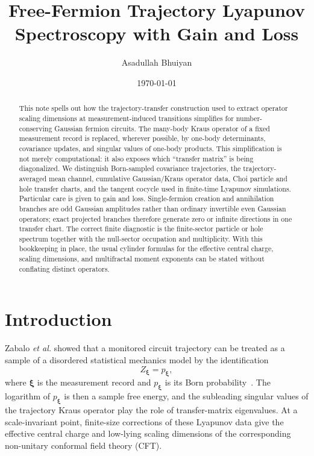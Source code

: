 \documentclass[aps,prb,onecolumn,nofootinbib,superscriptaddress]{revtex4-2}
\newcommand{\bxi}{{\boldsymbol{\xi}}}
\theoremstyle{plain}
\theoremstyle{definition}
\begin{document}
\title{Free-Fermion Trajectory Lyapunov Spectroscopy with Gain and Loss}
\author{Asadullah Bhuiyan}
\date{\today}

\begin{abstract}
This note spells out how the trajectory-transfer construction used to extract
operator scaling dimensions at measurement-induced transitions simplifies for
number-conserving Gaussian fermion circuits.  The many-body Kraus operator of a
fixed measurement record is replaced, wherever possible, by one-body
determinants, covariance updates, and singular values of one-body products.
This simplification is not merely computational: it also exposes which
``transfer matrix'' is being diagonalized.  We distinguish Born-sampled
covariance trajectories, the trajectory-averaged mean channel, cumulative
Gaussian/Kraus operator data, Choi particle and hole transfer charts, and the
tangent cocycle used in finite-time Lyapunov simulations.  Particular care is
given to gain and loss.  Single-fermion creation and annihilation branches are
odd Gaussian amplitudes rather than ordinary invertible even Gaussian
operators; exact projected branches therefore generate zero or infinite
directions in one transfer chart.  The correct finite diagnostic is the
finite-sector particle or hole spectrum together with the null-sector
occupation and multiplicity.  With this bookkeeping in place, the usual
cylinder formulas for the effective central charge, scaling dimensions, and
multifractal moment exponents can be stated without conflating distinct
operators.
\end{abstract}

\maketitle
\setcounter{tocdepth}{2}
\tableofcontents

\section{Introduction}

Zabalo \emph{et al.} showed that a monitored circuit trajectory can be treated
as a sample of a disordered statistical mechanics model by the identification
\begin{equation}
  Z_\bxi = p_\bxi ,
  \label{eq:intro-Z-p}
\end{equation}
where \(\bxi\) is the measurement record and \(p_\bxi\) is its Born
probability~\cite{Zabalo2022}.  The logarithm of \(p_\bxi\) is then a sample
free energy, and the subleading singular values of the trajectory Kraus
operator play the role of transfer-matrix eigenvalues.  At a scale-invariant
point, finite-size corrections of these Lyapunov data give the effective
central charge and low-lying scaling dimensions of the corresponding
non-unitary conformal field theory (CFT).
\end{document}
